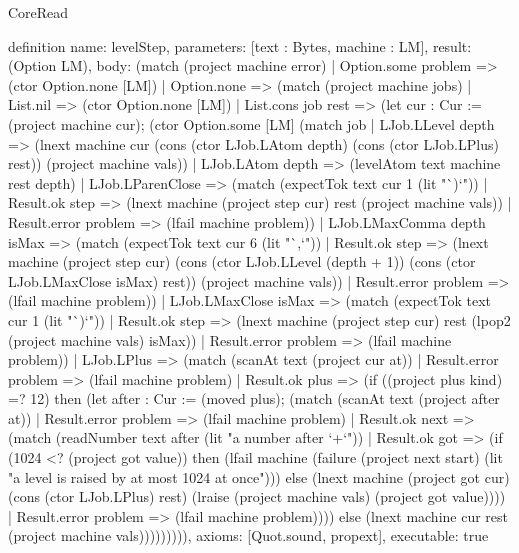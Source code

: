 \begin{lexlean}{CoreRead}
\begin{semanticmodule}
definition{
  name: levelStep,
  parameters: [text : Bytes, machine : LM],
  result: (Option LM),
  body: (match (project machine error)
    | Option.some problem => (ctor Option.none [LM])
    | Option.none => (match (project machine jobs)
      | List.nil => (ctor Option.none [LM])
      | List.cons job rest => (let cur : Cur := (project machine cur); (ctor Option.some [LM] (match job
        | LJob.LLevel depth => (lnext machine cur (cons (ctor LJob.LAtom depth) (cons (ctor LJob.LPlus) rest)) (project machine vals))
        | LJob.LAtom depth => (levelAtom text machine rest depth)
        | LJob.LParenClose => (match (expectTok text cur 1 (lit "`)`"))
          | Result.ok step => (lnext machine (project step cur) rest (project machine vals))
          | Result.error problem => (lfail machine problem))
        | LJob.LMaxComma depth isMax => (match (expectTok text cur 6 (lit "`,`"))
          | Result.ok step => (lnext machine (project step cur) (cons (ctor LJob.LLevel (depth + 1)) (cons (ctor LJob.LMaxClose isMax) rest)) (project machine vals))
          | Result.error problem => (lfail machine problem))
        | LJob.LMaxClose isMax => (match (expectTok text cur 1 (lit "`)`"))
          | Result.ok step => (lnext machine (project step cur) rest (lpop2 (project machine vals) isMax))
          | Result.error problem => (lfail machine problem))
        | LJob.LPlus => (match (scanAt text (project cur at))
          | Result.error problem => (lfail machine problem)
          | Result.ok plus => (if ((project plus kind) =? 12) then (let after : Cur := (moved plus); (match (scanAt text (project after at))
            | Result.error problem => (lfail machine problem)
            | Result.ok next => (match (readNumber text after (lit "a number after `+`"))
              | Result.ok got => (if (1024 <? (project got value)) then (lfail machine (failure (project next start) (lit "a level is raised by at most 1024 at once"))) else (lnext machine (project got cur) (cons (ctor LJob.LPlus) rest) (lraise (project machine vals) (project got value))))
              | Result.error problem => (lfail machine problem)))) else (lnext machine cur rest (project machine vals))))))))),
  axioms: [Quot.sound, propext],
  executable: true
}


\end{semanticmodule}
\end{lexlean}
